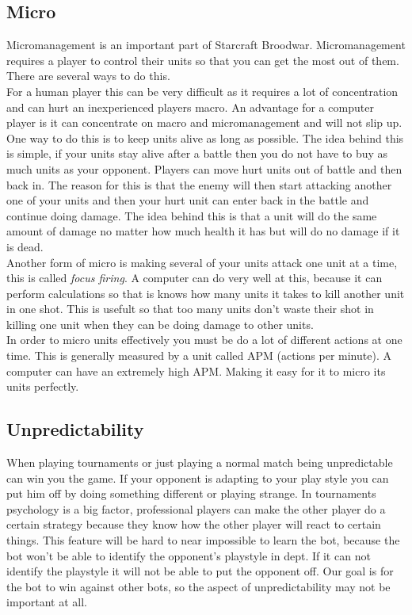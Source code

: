 				
	\subsection*{Micro}
		Micromanagement is an important part of Starcraft Broodwar. 
		Micromanagement requires a player to control their units so that you can get the most out of them. 
		There are several ways to do this.\\
		
		For a human player this can be very difficult as it requires a lot of concentration and can hurt an inexperienced players macro. 
		An advantage for a computer player is it can concentrate on macro and micromanagement and will not slip up.\\
		
		One way to do this is to keep units alive as long as possible. 
		The idea behind this is simple, if your units stay alive after a battle then you do not have to buy as much units as your opponent. 
		Players can move hurt units out of battle and then back in. 
		The reason for this is that the enemy will then start attacking another one of your 
		units and then your hurt unit can enter back in the battle and continue doing damage. 
		The idea behind this is that a unit will do the same amount of damage no matter how much health it has but will do no damage if it is dead.\\
		
		Another form of micro is making several of your units attack one unit at a time, this is called {\it focus firing}.
		A computer can do very well at this, because it can perform calculations so that is knows how many units it takes to kill another unit in one shot.
		This is usefult so that too many units don't waste their shot in killing one unit when they can be doing damage to other units.\\
		In order to micro units effectively you must be do a lot of different actions at one time. 
		This is generally measured by a unit called APM (actions per minute). 
		A computer can have an extremely high APM. Making it easy for it to micro its units perfectly.
		
	\subsection*{Unpredictability}
		When playing tournaments or just playing a normal match being unpredictable can win you the game. 
		If your opponent is adapting to your play style you can put him off by doing something different or playing strange.
		In tournaments psychology is a big factor, professional players can make the other player do a certain strategy because they know 
		how the other player will react to certain things. This feature will be hard to near impossible to learn the bot, because the bot won't be able to 
		identify the opponent's playstyle in dept. 
		If it can not identify the playstyle it will not be able to put the opponent off. Our goal is for the bot 
		to win against other bots, so the aspect of unpredictability may not be important at all. 
